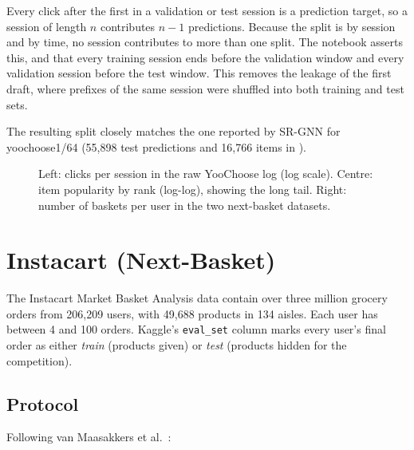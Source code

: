 Every click after the first in a validation or test session is a prediction
target, so a session of length $n$ contributes $n-1$ predictions. Because the
split is by session and by time, no session contributes to more than one split.
The notebook asserts this, and that every training session ends before the
validation window and every validation session before the test window. This
removes the leakage of the first draft, where prefixes of the same session were
shuffled into both training and test sets.


The resulting split closely matches the one reported by SR-GNN for
yoochoose1/64 (55,898 test predictions and 16,766 items in \cite{wu2019}).

\begin{figure}[H]
\centering
{}
\caption{Left: clicks per session in the raw YooChoose log (log scale). Centre:
item popularity by rank (log-log), showing the long tail. Right: number of
baskets per user in the two next-basket datasets.}
\label{fig:eda}
\end{figure}

\section{Instacart (Next-Basket)}

The Instacart Market Basket Analysis data contain over three million grocery
orders from 206,209 users, with 49,688 products in 134 aisles. Each user has
between 4 and 100 orders. Kaggle's \texttt{eval\_set} column marks every user's
final order as either \emph{train} (products given) or \emph{test} (products
hidden for the competition).

\subsection{Protocol}

Following van Maasakkers et al.\ \cite{vanmaasakkers2023}:


